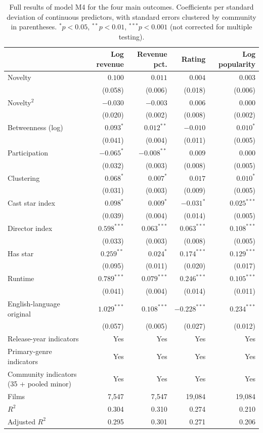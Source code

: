 \begin{table}[htbp]
\centering
\small
\caption[Full results of the full model M4]{Full results of model M4 for the four main outcomes. Coefficients per standard deviation of continuous predictors, with standard errors clustered by community in parentheses. $^{*}p<0.05$, $^{**}p<0.01$, $^{***}p<0.001$ (not corrected for multiple testing).}
\label{tab:full_m4}
\setlength{\tabcolsep}{4pt}
\begin{tabular}{lrrrr}
\hline
 & Log revenue & Revenue pct. & Rating & Log popularity \\
\hline
Novelty & $0.100$ & $0.011$ & $0.004$ & $0.003$ \\
 & (0.058) & (0.006) & (0.018) & (0.006) \\
Novelty$^2$ & $-0.030$ & $-0.003$ & $0.006$ & $0.000$ \\
 & (0.020) & (0.002) & (0.008) & (0.002) \\
Betweenness (log) & $0.093^{*}$ & $0.012^{**}$ & $-0.010$ & $0.010^{*}$ \\
 & (0.041) & (0.004) & (0.011) & (0.005) \\
Participation & $-0.065^{*}$ & $-0.008^{**}$ & $0.009$ & $0.000$ \\
 & (0.032) & (0.003) & (0.008) & (0.005) \\
Clustering & $0.068^{*}$ & $0.007^{*}$ & $0.017$ & $0.010^{*}$ \\
 & (0.031) & (0.003) & (0.009) & (0.005) \\
Cast star index & $0.098^{*}$ & $0.009^{*}$ & $-0.031^{*}$ & $0.025^{***}$ \\
 & (0.039) & (0.004) & (0.014) & (0.005) \\
Director index & $0.598^{***}$ & $0.063^{***}$ & $0.063^{***}$ & $0.108^{***}$ \\
 & (0.033) & (0.003) & (0.008) & (0.005) \\
Has star & $0.259^{**}$ & $0.024^{*}$ & $0.174^{***}$ & $0.129^{***}$ \\
 & (0.095) & (0.011) & (0.020) & (0.017) \\
Runtime & $0.789^{***}$ & $0.079^{***}$ & $0.246^{***}$ & $0.105^{***}$ \\
 & (0.041) & (0.004) & (0.014) & (0.011) \\
English-language original & $1.029^{***}$ & $0.108^{***}$ & $-0.228^{***}$ & $0.234^{***}$ \\
 & (0.057) & (0.005) & (0.027) & (0.012) \\
\hline
Release-year indicators & Yes & Yes & Yes & Yes \\
Primary-genre indicators & Yes & Yes & Yes & Yes \\
Community indicators (35 + pooled minor) & Yes & Yes & Yes & Yes \\
Films & 7,547 & 7,547 & 19,084 & 19,084 \\
$R^2$ & 0.304 & 0.310 & 0.274 & 0.210 \\
Adjusted $R^2$ & 0.295 & 0.301 & 0.271 & 0.206 \\
\hline
\end{tabular}
\end{table}
